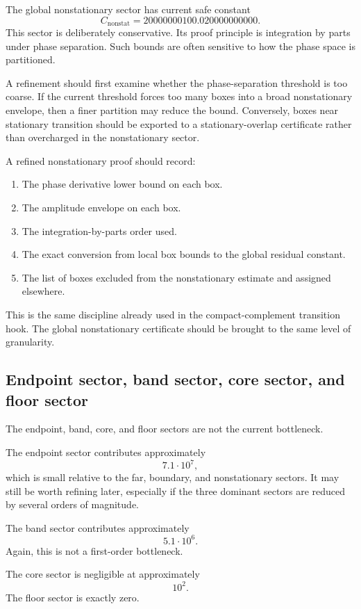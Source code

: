 \documentclass[11pt]{article}
\begin{document}
The global nonstationary sector has current safe constant
\[
C_{\mathrm{nonstat}}
=
20000000100.020000000000.
\]
This sector is deliberately conservative.  Its proof principle is integration by parts under phase separation.  Such bounds are often sensitive to how the phase space is partitioned.

A refinement should first examine whether the phase-separation threshold is too coarse.  If the current threshold forces too many boxes into a broad nonstationary envelope, then a finer partition may reduce the bound.  Conversely, boxes near stationary transition should be exported to a stationary-overlap certificate rather than overcharged in the nonstationary sector.

A refined nonstationary proof should record:

\begin{enumerate}[label=\arabic*.]
\item The phase derivative lower bound on each box.
\item The amplitude envelope on each box.
\item The integration-by-parts order used.
\item The exact conversion from local box bounds to the global residual constant.
\item The list of boxes excluded from the nonstationary estimate and assigned elsewhere.
\end{enumerate}

This is the same discipline already used in the compact-complement transition hook.  The global nonstationary certificate should be brought to the same level of granularity.

\subsection{Endpoint sector, band sector, core sector, and floor sector}

The endpoint, band, core, and floor sectors are not the current bottleneck.

The endpoint sector contributes approximately
\[
7.1\cdot 10^7,
\]
which is small relative to the far, boundary, and nonstationary sectors.  It may still be worth refining later, especially if the three dominant sectors are reduced by several orders of magnitude.

The band sector contributes approximately
\[
5.1\cdot 10^6.
\]
Again, this is not a first-order bottleneck.

The core sector is negligible at approximately
\[
10^2.
\]
The floor sector is exactly zero.
\end{document}
